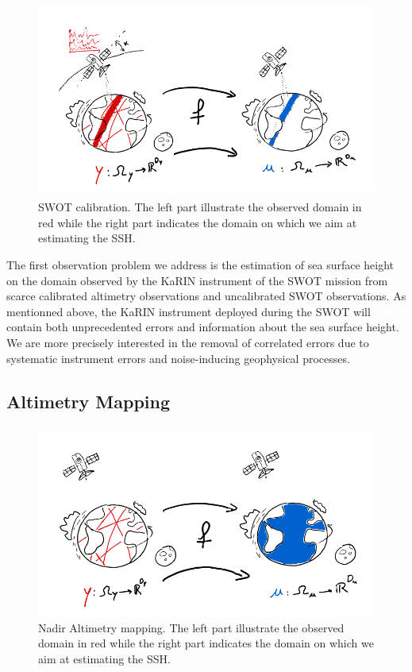 \begin{bibunit}
  \begin{figure}
      \centering
            \includegraphics[width=\linewidth]{Introduction/pics/calib_task.png}    
      \caption{SWOT calibration. The left part illustrate the observed domain in red while the right part indicates the domain on which we aim at estimating the SSH.}
      \label{fig:calibration_task}
  \end{figure}
The first observation problem we address is the estimation of sea surface height on the domain observed by the KaRIN instrument of the SWOT mission from scarce calibrated altimetry observations and uncalibrated SWOT observations.
As mentionned above, the KaRIN instrument deployed during the SWOT will contain both unprecedented errors and information about the sea surface height.
We are more precisely interested in the removal of correlated errors due to systematic instrument errors and noise-inducing geophysical processes.



\subsection{Altimetry Mapping}

  \begin{figure}
      \centering
            \includegraphics[width=\linewidth]{Introduction/pics/mapping_task.png}
      \caption{Nadir Altimetry mapping. The left part illustrate the observed domain in red while the right part indicates the domain on which we aim at estimating the SSH.}
      \label{fig:mapping_task}
  \end{figure}


\end{bibunit}

